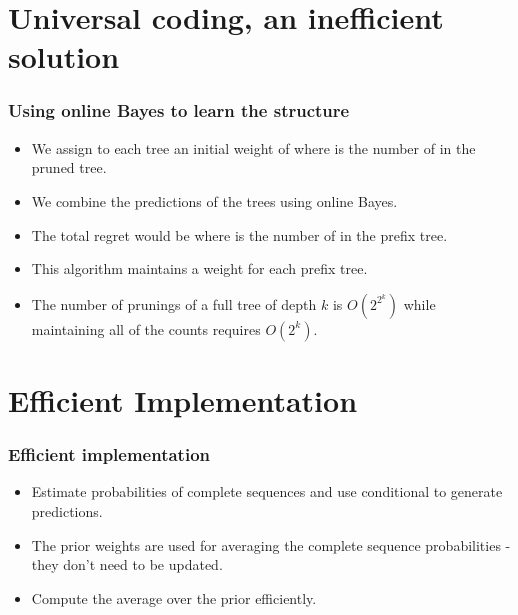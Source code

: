 \documentclass{beamer}
\begin{document}

\section{Universal coding, an inefficient solution}

\begin{frame}
\frametitle{Using online Bayes to learn the structure}
\begin{itemize}
\item We assign to each tree an initial weight of  where
   is the number of  in the  pruned tree.
\item We combine the predictions of the trees using online Bayes.
\item The total regret would be  where  is the number of  in the prefix tree.
\item This algorithm maintains a weight for each prefix tree.
\item The number of prunings of a full tree of depth $k$ is
  $O(2^{2^k})$ while maintaining all of the counts requires $O(2^k)$. 
\end{itemize}
\end{frame}


\section{Efficient Implementation}

\begin{frame}
\frametitle{Efficient implementation}
\begin{itemize}
\item {} Estimate probabilities of complete sequences and use conditional to generate predictions.
\item The prior weights are used for averaging the complete sequence probabilities - they don't need to be updated.
\item {} Compute the average over the prior efficiently.
\end{itemize}
\end{frame}
\end{document}
